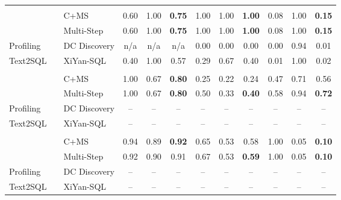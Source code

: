 \begin{tabular}{llccccccccc}
\midrule
\addlinespace[2pt]
\multicolumn{11}{c}{\textbf{Tax}} \\
\addlinespace[1pt]
\multirow{2}{*}{\system} & ~~C+MS & 0.60 & 1.00 & \textbf{0.75} & 1.00 & 1.00 & \textbf{1.00} & 0.08 & 1.00 & \textbf{0.15} \\
 & ~~Multi-Step & 0.60 & 1.00 & \textbf{0.75} & 1.00 & 1.00 & \textbf{1.00} & 0.08 & 1.00 & \textbf{0.15} \\
\cmidrule(l){2-11}
\multirow{1}{*}{Profiling} & ~~DC Discovery & n/a & n/a & n/a & 0.00 & 0.00 & 0.00 & 0.00 & 0.94 & 0.01 \\
\cmidrule(l){2-11}
\multirow{1}{*}{Text2SQL} & ~~XiYan-SQL & 0.40 & 1.00 & 0.57 & 0.29 & 0.67 & 0.40 & 0.01 & 1.00 & 0.02 \\
\midrule
\addlinespace[2pt]
\multicolumn{11}{c}{\textbf{HMDAZ}} \\
\addlinespace[1pt]
\multirow{2}{*}{\system} & ~~C+MS & 1.00 & 0.67 & \textbf{0.80} & 0.25 & 0.22 & 0.24 & 0.47 & 0.71 & 0.56 \\
 & ~~Multi-Step & 1.00 & 0.67 & \textbf{0.80} & 0.50 & 0.33 & \textbf{0.40} & 0.58 & 0.94 & \textbf{0.72} \\
\cmidrule(l){2-11}
\multirow{1}{*}{Profiling} & ~~DC Discovery & -- & -- & -- & -- & -- & -- & -- & -- & -- \\
\cmidrule(l){2-11}
\multirow{1}{*}{Text2SQL} & ~~XiYan-SQL & -- & -- & -- & -- & -- & -- & -- & -- & -- \\
\midrule
\addlinespace[2pt]
\multicolumn{11}{c}{\textbf{HMDA Checks}} \\
\addlinespace[1pt]
\multirow{2}{*}{\system} & ~~C+MS & 0.94 & 0.89 & \textbf{0.92} & 0.65 & 0.53 & 0.58 & 1.00 & 0.05 & \textbf{0.10} \\
 & ~~Multi-Step & 0.92 & 0.90 & 0.91 & 0.67 & 0.53 & \textbf{0.59} & 1.00 & 0.05 & \textbf{0.10} \\
\cmidrule(l){2-11}
\multirow{1}{*}{Profiling} & ~~DC Discovery & -- & -- & -- & -- & -- & -- & -- & -- & -- \\
\cmidrule(l){2-11}
\multirow{1}{*}{Text2SQL} & ~~XiYan-SQL & -- & -- & -- & -- & -- & -- & -- & -- & -- \\
\bottomrule
\end{tabular}
